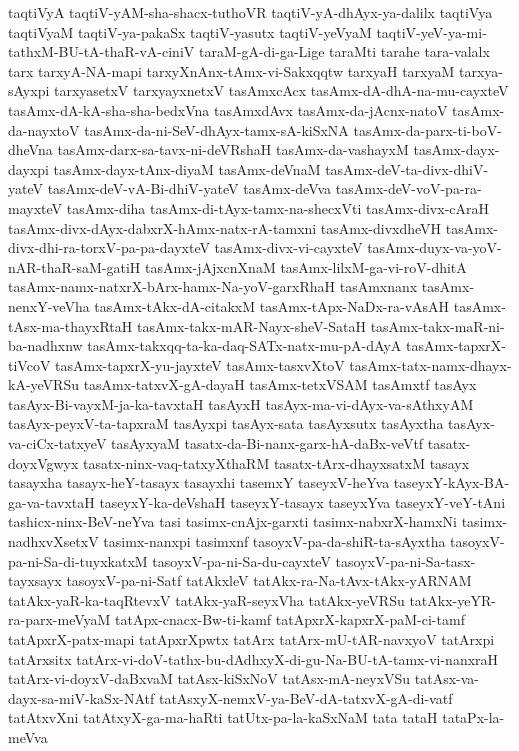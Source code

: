 {taqtiVyA
taqtiV-yAM-sha-shacx-tuthoVR
taqtiV-yA-dhAyx-ya-dalilx
taqtiVya
taqtiVyaM
taqtiV-ya-pakaSx
taqtiV-yasutx
taqtiV-yeVyaM
taqtiV-yeV-ya-mi-tathxM-BU-tA-thaR-vA-ciniV
taraM-gA-di-ga-Lige
taraMti
tarahe
tara-valalx
tarx
tarxyA-NA-mapi
tarxyXnAnx-tAmx-vi-Sakxqqtw
tarxyaH
tarxyaM
tarxya-sAyxpi
tarxyasetxV
tarxyayxnetxV
tasAmxcAcx
tasAmx-dA-dhA-na-mu-cayxteV
tasAmx-dA-kA-sha-sha-bedxVna
tasAmxdAvx
tasAmx-da-jAcnx-natoV
tasAmx-da-nayxtoV
tasAmx-da-ni-SeV-dhAyx-tamx-sA-kiSxNA
tasAmx-da-parx-ti-boV-dheVna
tasAmx-darx-sa-tavx-ni-deVRshaH
tasAmx-da-vashayxM
tasAmx-dayx-dayxpi
tasAmx-dayx-tAnx-diyaM
tasAmx-deVnaM
tasAmx-deV-ta-divx-dhiV-yateV
tasAmx-deV-vA-Bi-dhiV-yateV
tasAmx-deVva
tasAmx-deV-voV-pa-ra-mayxteV
tasAmx-diha
tasAmx-di-tAyx-tamx-na-shecxVti
tasAmx-divx-cAraH
tasAmx-divx-dAyx-dabxrX-hAmx-natx-rA-tamxni
tasAmx-divxdheVH
tasAmx-divx-dhi-ra-torxV-pa-pa-dayxteV
tasAmx-divx-vi-cayxteV
tasAmx-duyx-va-yoV-nAR-thaR-saM-gatiH
tasAmx-jAjxcnXnaM
tasAmx-lilxM-ga-vi-roV-dhitA
tasAmx-namx-natxrX-bArx-hamx-Na-yoV-garxRhaH
tasAmxnanx
tasAmx-nenxY-veVha
tasAmx-tAkx-dA-citakxM
tasAmx-tApx-NaDx-ra-vAsAH
tasAmx-tAsx-ma-thayxRtaH
tasAmx-takx-mAR-Nayx-sheV-SataH
tasAmx-takx-maR-ni-ba-nadhxnw
tasAmx-takxqq-ta-ka-daq-SATx-natx-mu-pA-dAyA
tasAmx-tapxrX-tiVcoV
tasAmx-tapxrX-yu-jayxteV
tasAmx-tasxvXtoV
tasAmx-tatx-namx-dhayx-kA-yeVRSu
tasAmx-tatxvX-gA-dayaH
tasAmx-tetxVSAM
tasAmxtf
tasAyx
tasAyx-Bi-vayxM-ja-ka-tavxtaH
tasAyxH
tasAyx-ma-vi-dAyx-va-sAthxyAM
tasAyx-peyxV-ta-tapxraM
tasAyxpi
tasAyx-sata
tasAyxsutx
tasAyxtha
tasAyx-va-ciCx-tatxyeV
tasAyxyaM
tasatx-da-Bi-nanx-garx-hA-daBx-veVtf
tasatx-doyxVgwyx
tasatx-ninx-vaq-tatxyXthaRM
tasatx-tArx-dhayxsatxM
tasayx
tasayxha
tasayx-heY-tasayx
tasayxhi
tasemxY
taseyxV-heYva
taseyxY-kAyx-BA-ga-va-tavxtaH
taseyxY-ka-deVshaH
taseyxY-tasayx
taseyxYva
taseyxY-veY-tAni
tashicx-ninx-BeV-neYva
tasi
tasimx-cnAjx-garxti
tasimx-nabxrX-hamxNi
tasimx-nadhxvXsetxV
tasimx-nanxpi
tasimxnf
tasoyxV-pa-da-shiR-ta-sAyxtha
tasoyxV-pa-ni-Sa-di-tuyxkatxM
tasoyxV-pa-ni-Sa-du-cayxteV
tasoyxV-pa-ni-Sa-tasx-tayxsayx
tasoyxV-pa-ni-Satf
tatAkxleV
tatAkx-ra-Na-tAvx-tAkx-yARNAM
tatAkx-yaR-ka-taqRtevxV
tatAkx-yaR-seyxVha
tatAkx-yeVRSu
tatAkx-yeYR-ra-parx-meVyaM
tatApx-cnacx-Bw-ti-kamf
tatApxrX-kapxrX-paM-ci-tamf
tatApxrX-patx-mapi
tatApxrXpwtx
tatArx
tatArx-mU-tAR-navxyoV
tatArxpi
tatArxsitx
tatArx-vi-doV-tathx-bu-dAdhxyX-di-gu-Na-BU-tA-tamx-vi-nanxraH
tatArx-vi-doyxV-daBxvaM
tatAsx-kiSxNoV
tatAsx-mA-neyxVSu
tatAsx-va-dayx-sa-miV-kaSx-NAtf
tatAsxyX-nemxV-ya-BeV-dA-tatxvX-gA-di-vatf
tatAtxvXni
tatAtxyX-ga-ma-haRti
tatUtx-pa-la-kaSxNaM
tata
tataH
tataPx-la-meVva
}
